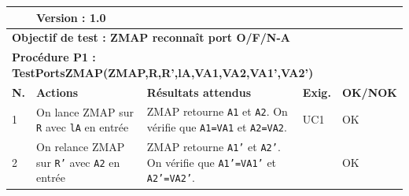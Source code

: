 \documentclass[a4paper,11pt,french]{article}
\begin{document}
\noindent
\begin{tabular}{|p{0.5cm}| p{6cm} | p{1cm} | p{4cm} | p{1.5cm}| p{1.5cm}|} 
\hline
\rowcolor{blue}
\multicolumn{2}{|l|}{\color{white}\bfseries{Objet testé : \color{white} \bfseries{ZMAP} }} & 
\multicolumn{4}{l|}{\color{white}\bfseries{Version : \color{white}\bfseries{1.0} }}\\
\hline
\multicolumn{6}{|l|}{\textbf{Objectif de test : ZMAP reconnaît port O/F/N-A} }\\
\hline
\multicolumn{6}{|l|}{\textbf{Procédure P1 : TestPortsZMAP(ZMAP,R,R',lA,VA1,VA2,VA1',VA2')} }\\
\hline
\textbf{N.} & \textbf{Actions} & \multicolumn{2}{p{5cm}|}{\textbf{Résultats attendus}} & \textbf{Exig.} & \textbf{OK/NOK} \\
\hline
1 & On lance ZMAP sur \texttt{R} avec \texttt{lA} en entrée  & \multicolumn{2}{p{6cm}|}{ZMAP retourne \texttt{A1} et \texttt{A2}. On vérifie que \texttt{A1=VA1} et \texttt{A2=VA2}. } & UC1 & OK \\
\hline
2 & On relance ZMAP sur \texttt{R'} avec \texttt{A2} en entrée  & \multicolumn{2}{p{6cm}|}{ZMAP retourne \texttt{A1'} et \texttt{A2'}. On vérifie que \texttt{A1'=VA1'} et \texttt{A2'=VA2'}. } & &  OK \\
\hline
\end{tabular}

%
\end{document}
